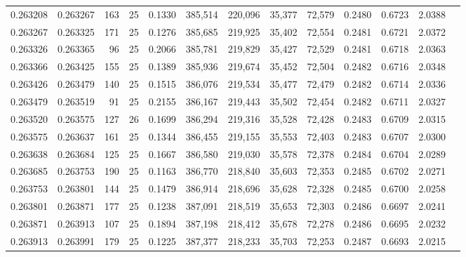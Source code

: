 \begin{tabular}{rrrrrrrrrrrrr}
0.263208 & 0.263267 &   163 &  25 &                                     0.1330 & 385,514 & 220,096 &  35,377 &  72,579 & 0.2480 & 0.6723 & 2.0388 \\
0.263267 & 0.263325 &   171 &  25 &                                     0.1276 & 385,685 & 219,925 &  35,402 &  72,554 & 0.2481 & 0.6721 & 2.0372 \\
0.263326 & 0.263365 &    96 &  25 &                                     0.2066 & 385,781 & 219,829 &  35,427 &  72,529 & 0.2481 & 0.6718 & 2.0363 \\
0.263366 & 0.263425 &   155 &  25 &                                     0.1389 & 385,936 & 219,674 &  35,452 &  72,504 & 0.2482 & 0.6716 & 2.0348 \\
0.263426 & 0.263479 &   140 &  25 &                                     0.1515 & 386,076 & 219,534 &  35,477 &  72,479 & 0.2482 & 0.6714 & 2.0336 \\
0.263479 & 0.263519 &    91 &  25 &                                     0.2155 & 386,167 & 219,443 &  35,502 &  72,454 & 0.2482 & 0.6711 & 2.0327 \\
0.263520 & 0.263575 &   127 &  26 &                                     0.1699 & 386,294 & 219,316 &  35,528 &  72,428 & 0.2483 & 0.6709 & 2.0315 \\
0.263575 & 0.263637 &   161 &  25 &                                     0.1344 & 386,455 & 219,155 &  35,553 &  72,403 & 0.2483 & 0.6707 & 2.0300 \\
0.263638 & 0.263684 &   125 &  25 &                                     0.1667 & 386,580 & 219,030 &  35,578 &  72,378 & 0.2484 & 0.6704 & 2.0289 \\
0.263685 & 0.263753 &   190 &  25 &                                     0.1163 & 386,770 & 218,840 &  35,603 &  72,353 & 0.2485 & 0.6702 & 2.0271 \\
0.263753 & 0.263801 &   144 &  25 &                                     0.1479 & 386,914 & 218,696 &  35,628 &  72,328 & 0.2485 & 0.6700 & 2.0258 \\
0.263801 & 0.263871 &   177 &  25 &                                     0.1238 & 387,091 & 218,519 &  35,653 &  72,303 & 0.2486 & 0.6697 & 2.0241 \\
0.263871 & 0.263913 &   107 &  25 &                                     0.1894 & 387,198 & 218,412 &  35,678 &  72,278 & 0.2486 & 0.6695 & 2.0232 \\
0.263913 & 0.263991 &   179 &  25 &                                     0.1225 & 387,377 & 218,233 &  35,703 &  72,253 & 0.2487 & 0.6693 & 2.0215 \\

\end{tabular}
